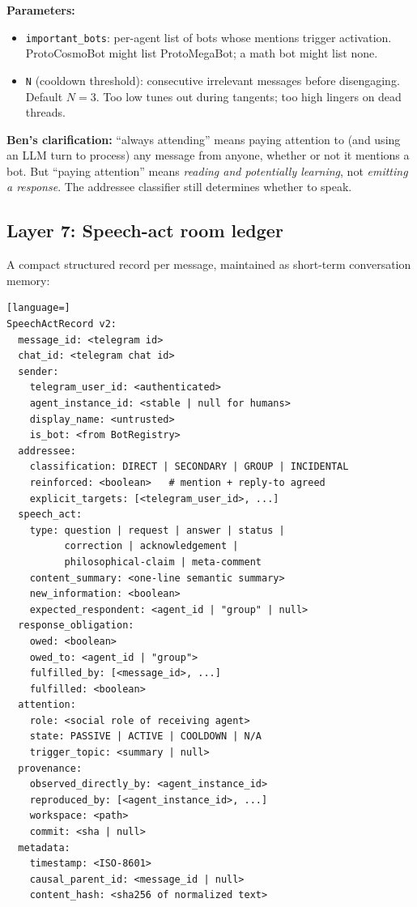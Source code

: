 \documentclass[11pt]{article}
\begin{document}
\textbf{Parameters:}
\begin{itemize}
\item \texttt{important\_bots}: per-agent list of bots whose mentions trigger
activation.  ProtoCosmoBot might list ProtoMegaBot; a math bot might list none.
\item \texttt{N} (cooldown threshold): consecutive irrelevant messages before
disengaging.  Default $N=3$.  Too low tunes out during tangents; too high
lingers on dead threads.
\end{itemize}

\textbf{Ben's clarification:} ``always attending'' means paying attention to
(and using an LLM turn to process) any message from anyone, whether or not it
mentions a bot.  But ``paying attention'' means \emph{reading and potentially
learning}, not \emph{emitting a response}.  The addressee classifier still
determines whether to speak.

\subsection{Layer 7: Speech-act room ledger}

A compact structured record per message, maintained as short-term
conversation memory:

\begin{lstlisting}[language=]
SpeechActRecord v2:
  message_id: <telegram id>
  chat_id: <telegram chat id>
  sender:
    telegram_user_id: <authenticated>
    agent_instance_id: <stable | null for humans>
    display_name: <untrusted>
    is_bot: <from BotRegistry>
  addressee:
    classification: DIRECT | SECONDARY | GROUP | INCIDENTAL
    reinforced: <boolean>   # mention + reply-to agreed
    explicit_targets: [<telegram_user_id>, ...]
  speech_act:
    type: question | request | answer | status |
          correction | acknowledgement |
          philosophical-claim | meta-comment
    content_summary: <one-line semantic summary>
    new_information: <boolean>
    expected_respondent: <agent_id | "group" | null>
  response_obligation:
    owed: <boolean>
    owed_to: <agent_id | "group">
    fulfilled_by: [<message_id>, ...]
    fulfilled: <boolean>
  attention:
    role: <social role of receiving agent>
    state: PASSIVE | ACTIVE | COOLDOWN | N/A
    trigger_topic: <summary | null>
  provenance:
    observed_directly_by: <agent_instance_id>
    reproduced_by: [<agent_instance_id>, ...]
    workspace: <path>
    commit: <sha | null>
  metadata:
    timestamp: <ISO-8601>
    causal_parent_id: <message_id | null>
    content_hash: <sha256 of normalized text>
\end{lstlisting}
\end{document}
